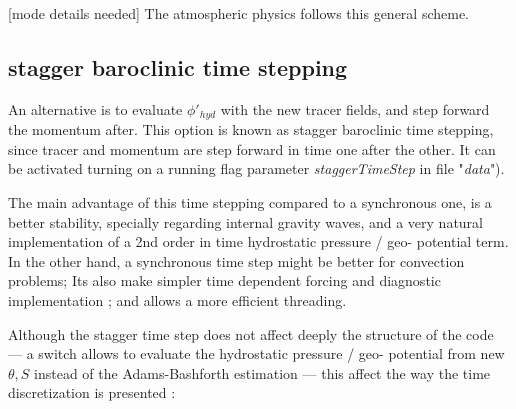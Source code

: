 [mode details needed]
The atmospheric physics follows this general scheme.

\subsection{stagger baroclinic time stepping}

An alternative is to evaluate $\phi'_{hyd}$ with the 
new tracer fields, and step forward the momentum after.
This option is known as stagger baroclinic time stepping, 
since tracer and momentum are step forward in time one after the other.
It can be activated turning on a running flag parameter 
{\it staggerTimeStep} in file "{\it data}"). 

The main advantage of this time stepping compared to a synchronous one,
is a better stability, specially regarding internal gravity waves,
and a very natural implementation of a 2nd order in time 
hydrostatic pressure / geo- potential term.
In the other hand, a synchronous time step might be  better
for convection problems; Its also make simpler time dependent forcing
and diagnostic implementation ; and allows a more efficient threading.

Although the stagger time step does not affect deeply the 
structure of the code --- a switch allows to evaluate the 
hydrostatic pressure / geo- potential from new $\theta,S$ 
instead of the Adams-Bashforth estimation ---
this affect the way the time discretization is presented :


